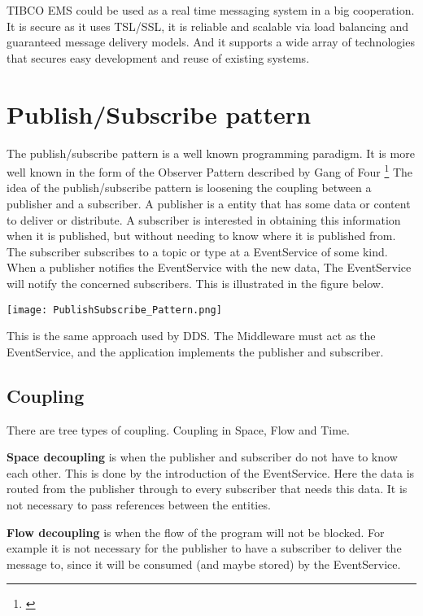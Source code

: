 TIBCO EMS could be used as a real time messaging system in a big cooperation. It is secure as it uses TSL/SSL, it is reliable and scalable via load balancing and guaranteed message delivery models. And it supports a wide array of technologies that secures easy development and reuse of existing systems.

\section{Publish/Subscribe pattern}
The publish/subscribe pattern is a well known programming paradigm. It is more well known in the form of the Observer Pattern described by Gang of Four \footnote{\citep{DesignPatterns}}
The idea of the publish/subscribe pattern is loosening the coupling between a publisher and a subscriber. A publisher is a entity that has some data or content to deliver or distribute. A subscriber is interested in obtaining this information when it is published, but without needing to know where it is published from.
The subscriber subscribes to a topic or type at a EventService of some kind. When a publisher notifies the EventService with the new data, The EventService will notify the concerned subscribers. This is illustrated in the figure below.

\begin{center}
	\texttt{[image: PublishSubscribe\_Pattern.png]}
\end{center}

This is the same approach used by DDS. The Middleware must act as the EventService, and the application implements the publisher and subscriber.

\subsection{Coupling}
There are tree types of coupling. Coupling in Space, Flow and Time.

\textbf{Space decoupling} is when the publisher and subscriber do not have to know each other. This is done by the introduction of the EventService.  Here the data is routed from the publisher through to every subscriber that needs this data. It is not necessary to pass references between the entities.

\textbf{Flow decoupling} is when the flow of the program will not be blocked. For example it is not necessary for the publisher to have a subscriber to deliver the message to, since it will be consumed (and maybe stored) by the EventService. 

